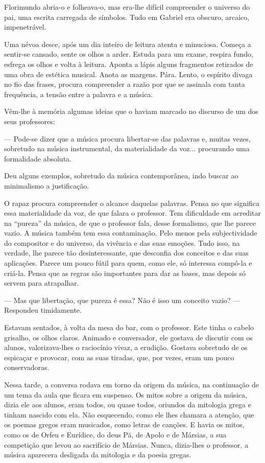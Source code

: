 Florimundo abria-o e folheava-o, mas era-lhe difícil compreender o
universo do pai, uma escrita carregada de símbolos. Tudo em Gabriel era
obscuro, arcaico, impenetrável.

Uma névoa desce, após um dia inteiro de leitura atenta e minuciosa.
Começa a sentir-se cansado, sente os olhos a arder. Estuda para um
exame, respira fundo, esfrega os olhos e volta à leitura. Aponta a lápis
alguns fragmentos retirados de uma obra de estética musical. Anota as
margens. Pára. Lento, o espírito divaga no fio das frases, procura
compreender a razão por que se assinala com tanta frequência, a tensão
entre a palavra e a música.

Vêm-lhe à memória algumas ideias que o haviam marcado no discurso de um
dos seus professores:

--- Pode-se dizer que a música procura libertar-se das palavras e, muitas
vezes, sobretudo na música instrumental, da materialidade da voz...
procurando uma formalidade absoluta.

Deu alguns exemplos, sobretudo da música contemporânea, indo buscar ao
minimalismo a justificação.

O rapaz procura compreender o alcance daquelas palavras. Pensa no que
significa essa materialidade da voz, de que falara o professor. Tem
dificuldade em acreditar na ``pureza'' da música, de que o professor
fala, desse formalismo, que lhe parece vazio. A música também tem essa
contaminação. Pelo menos pela subjectividade do compositor e do
universo, da vivência e das suas emoções. Tudo isso, na verdade, lhe
parece tão desinteressante, que desconfia dos conceitos e das suas
aplicações. Parece um pouco fútil para quem, como ele, só interessa
compô-la e criá-la. Pensa que as regras são importantes para dar as
bases, mas depois só servem para atrapalhar.

--- Mas que libertação, que pureza é essa? Não é isso um conceito vazio?
--- Respondeu timidamente.

Estavam sentados, à volta da mesa do bar, com o professor. Este tinha o
cabelo grisalho, os olhos claros. Animado e conversador, ele gostava de
discutir com os alunos, valorizava-lhes o raciocínio vivaz, a erudição.
Gostava sobretudo de os espicaçar e provocar, com as suas tiradas, que,
por vezes, eram um pouco conservadoras.

Nessa tarde, a conversa rodava em torno da origem da música, na
continuação de um tema da aula que ficara em suspenso. Os mitos sobre a
origem da música, dizia ele aos alunos, eram todos, ou quase todos,
oriundos da mitologia grega e tinham nascido com ela. Não esquecendo,
como ele lhes chamara a atenção, que os poemas gregos eram musicados,
como letras de canções. E havia os mitos, como os de Orfeu e Eurídice,
do deus Pã, de Apolo e de Mársias, a sua competição que levou ao
sacrifício de Mársias. Nunca, dizia-lhes o professor, a música aparecera
desligada da mitologia e da poesia gregas.

